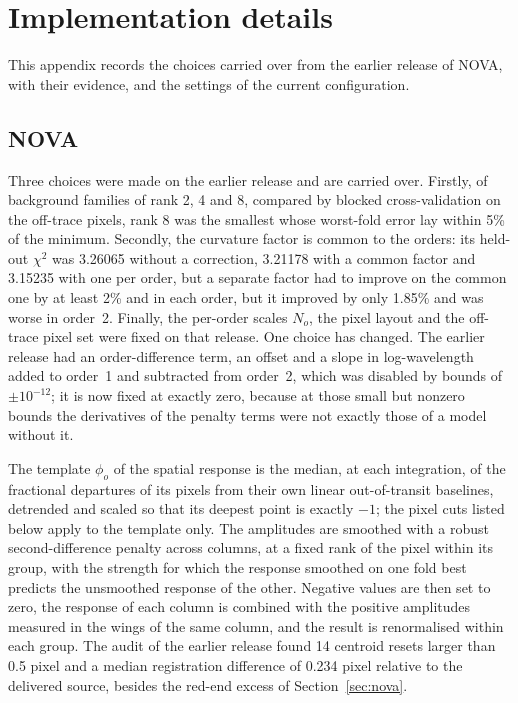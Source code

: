 \section{Implementation details}
\label{app:implementation}

This appendix records the choices carried over from the earlier release of
NOVA, with their evidence, and the settings of the current configuration.

\subsection{NOVA}
\label{app:nova}

Three choices were made on the earlier release and are carried over.
Firstly, of background families of rank 2, 4 and 8, compared by blocked
cross-validation on the off-trace pixels, rank 8 was the smallest whose
worst-fold error lay within 5\% of the minimum. Secondly, the curvature factor
is common to the orders: its held-out $\chi^2$ was 3.26065 without a
correction, 3.21178 with a common factor and 3.15235 with one per order, but a
separate factor had to improve on the common one by at least 2\% and in each
order, but it improved by only 1.85\% and was worse in order~2. Finally, the
per-order scales $N_o$, the pixel layout and the off-trace pixel set were
fixed on that release. One choice has changed. The earlier release had an order-difference
term, an offset and a slope in log-wavelength added to order~1 and
subtracted from order~2, which was disabled by bounds of $\pm10^{-12}$; it is
now fixed at exactly zero, because at those small but nonzero bounds the
derivatives of the penalty terms were not exactly those of a model without
it.

The template $\phi_o$ of the spatial response is the median, at each
integration, of the fractional departures of its pixels from their own linear
out-of-transit baselines, detrended and scaled so that its deepest point is
exactly $-1$; the pixel cuts listed below apply to the template only. The
amplitudes are smoothed with a robust second-difference penalty across
columns, at a fixed rank of the pixel within its group, with the strength for
which the response smoothed on one fold best predicts the unsmoothed response
of the other. Negative values are then set to zero, the response of each
column is combined with the positive amplitudes measured in the wings of the
same column, and the result is renormalised within each group. The audit of
the earlier release found 14 centroid resets larger than 0.5 pixel and a
median registration difference of 0.234 pixel relative to the delivered
source, besides the red-end excess of Section~\ref{sec:nova}.

